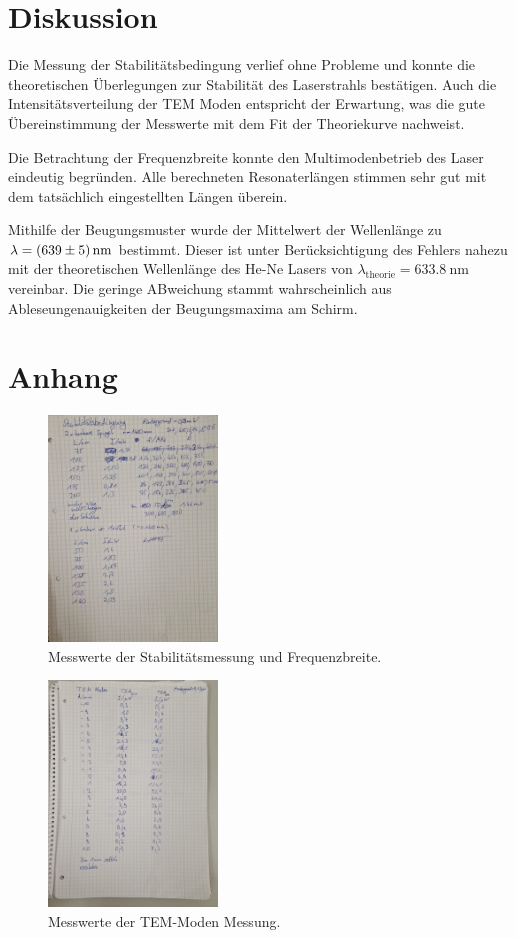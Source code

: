 \section{Diskussion}
\label{sec:Diskussion}
Die Messung der Stabilitätsbedingung verlief ohne Probleme und konnte die theoretischen
Überlegungen zur Stabilität des Laserstrahls bestätigen.
Auch die Intensitätsverteilung der TEM Moden entspricht der Erwartung, was die gute
Übereinstimmung der Messwerte mit dem Fit der Theoriekurve nachweist.

Die Betrachtung der Frequenzbreite konnte den Multimodenbetrieb des Laser eindeutig begründen.
Alle berechneten Resonaterlängen stimmen sehr gut mit dem tatsächlich eingestellten Längen überein.

Mithilfe der Beugungsmuster wurde der Mittelwert der Wellenlänge zu $\lambda =\qty{639+-5}{\nano\metre}$
bestimmt. Dieser ist unter Berücksichtigung des Fehlers nahezu mit der theoretischen Wellenlänge \cite{laser} des
He-Ne Lasers von $\lambda_{\text{theorie}} =\qty{633.8}{\nano\metre}$ vereinbar.
Die geringe ABweichung stammt wahrscheinlich aus Ableseungenauigkeiten der Beugungsmaxima am Schirm.

\section{Anhang}
\label{sec:Anhang}
\begin{figure}
    \centering
    \includegraphics[height=6cm]{content/pics/stabil.jpg}
    \caption{Messwerte der Stabilitätsmessung und Frequenzbreite.}
\end{figure}

\begin{figure}
    \centering
    \includegraphics[height=6cm]{content/pics/TEM.jpg}
    \caption{Messwerte der TEM-Moden Messung.}
\end{figure}

